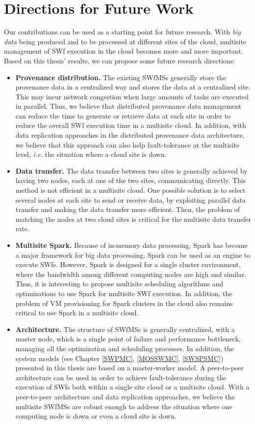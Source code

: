 \section{Directions for Future Work}

Our contributions can be used as a starting point for future research. With \textit{big data} being produced and to be processed at different sites of the cloud, multisite management of SWf execution in the cloud becomes more and more important. Based on this thesis' results, we can propose some future research directions:
\begin{itemize}
\item \textbf{Provenance distribution.} The existing SWfMSs generally store the provenance data in a centralized way and stores the data at a centralized site. This may incur network congestion when large amounts of tasks are executed in parallel. Thus, we believe that distributed provenance data management can reduce the time to generate or retrieve data at each site in order to reduce the overall SWf execution time in a multisite cloud. In addition, with data replication approaches in the distributed provenance data architecture, we believe that this approach can also help fault-tolerance at the multisite level, \textit{i.e.} the situation where a cloud site is down.
\item \textbf{Data transfer.} The data transfer between two sites is generally achieved by
having two nodes, each at one of the two sites, communicating directly. This method is not efficient in a multisite cloud. One possible solution is to select several nodes at each site to send or receive data, by exploiting parallel data transfer and making the data transfer more efficient. Then, the problem of matching the nodes at two cloud sites is critical for the multisite data transfer rate. 
\item \textbf{Multisite Spark.} Because of in-memory data processing, Spark has become a major framework for big data processing. Spark can be used as an engine to execute SWfs. However, Spark is designed for a single cluster environment, where the bandwidth among different computing nodes are high and similar. Thus, it is interesting to propose multisite scheduling algorithms and optimizations to use Spark for multisite SWf execution. In addition, the problem of VM provisioning for Spark clusters in the cloud also remains critical to use Spark in a multisite cloud.
\item \textbf{Architecture.} The structure of SWfMSs is generally centralized, with a master node, which is a single point of failure and performance bottleneck, managing all the optimization and scheduling processes. In addition, the system models (see Chapter \ref{SWPMC}, \ref{MOSSWMC}, \ref{SWSPSMC}) presented in this thesis are based on a master-worker model. A peer-to-peer architecture can be used in order to achieve fault-tolerance during the execution of SWfs both within a single site cloud or a multisite cloud. With a peer-to-peer architecture and data replication approaches, we believe the multisite SWfMSs are robust enough to address the situation where one computing node is down or even a cloud site is down.

\end{itemize}
